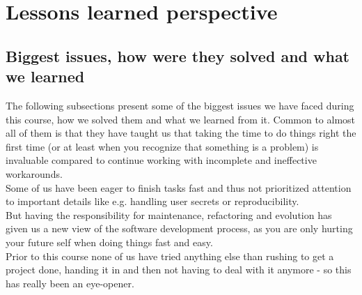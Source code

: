 \section{Lessons learned perspective}
\subsection{Biggest issues, how were they solved and what we learned}



The following subsections present some of the biggest issues we have faced during this course, how we solved them and what we learned from it. Common to almost all of them is that they have taught us that taking the time to do things right the first time (or at least when you recognize that something is a problem) is invaluable compared to continue working with incomplete and ineffective workarounds. \\ Some of us have been eager to finish tasks fast and thus not prioritized attention to important details like e.g. handling user secrets or reproducibility. \\
But having the responsibility for maintenance, refactoring and evolution has given us a new view of the software development process, as you are only hurting your future self when doing things fast and easy. \\
Prior to this course none of us have tried anything else than rushing to get a project done, handing it in and then not having to deal with it anymore - so this has really been an eye-opener. \\

